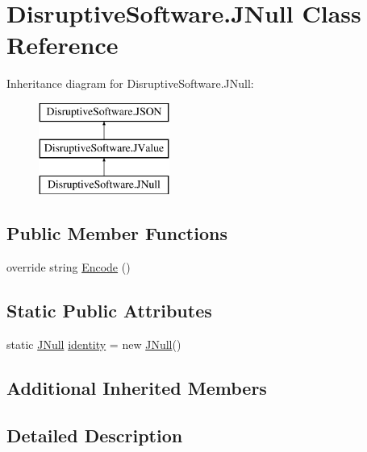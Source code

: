 \hypertarget{class_disruptive_software_1_1_j_null}{\section{Disruptive\+Software.\+J\+Null Class Reference}
\label{class_disruptive_software_1_1_j_null}
}
Inheritance diagram for Disruptive\+Software.\+J\+Null\+:\begin{figure}[H]
\begin{center}
\leavevmode
\includegraphics[height=3.000000cm]{class_disruptive_software_1_1_j_null}
\end{center}
\end{figure}
\subsection*{Public Member Functions}
\begin{DoxyCompactItemize}
\item 
override string \hyperlink{class_disruptive_software_1_1_j_null_a27bdb4d2316d155c89d294ff08e87c90}{Encode} ()
\end{DoxyCompactItemize}
\subsection*{Static Public Attributes}
\begin{DoxyCompactItemize}
\item 
static \hyperlink{class_disruptive_software_1_1_j_null}{J\+Null} \hyperlink{class_disruptive_software_1_1_j_null_ac3e5ccd3039413ccaa7584fa12fb0054}{identity} = new \hyperlink{class_disruptive_software_1_1_j_null}{J\+Null}()
\end{DoxyCompactItemize}
\subsection*{Additional Inherited Members}


\subsection{Detailed Description}


